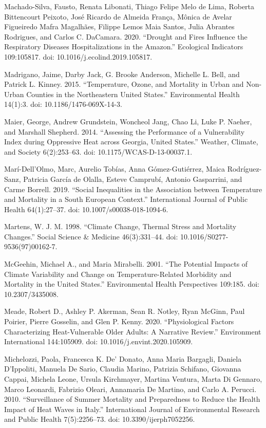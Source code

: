 \documentclass[12pt]{article}
\begin{document}
Machado-Silva, Fausto, Renata Libonati, Thiago Felipe Melo de Lima,
Roberta Bittencourt Peixoto, José Ricardo de Almeida França, Mônica de
Avelar Figueiredo Mafra Magalhães, Filippe Lemos Maia Santos, Julia
Abrantes Rodrigues, and Carlos C. DaCamara. 2020. ``Drought and Fires
Influence the Respiratory Diseases Hospitalizations in the Amazon.''
Ecological Indicators 109:105817. doi: 10.1016/j.ecolind.2019.105817.

Madrigano, Jaime, Darby Jack, G. Brooke Anderson, Michelle L. Bell, and
Patrick L. Kinney. 2015. ``Temperature, Ozone, and Mortality in Urban
and Non-Urban Counties in the Northeastern United States.''
Environmental Health 14(1):3. doi: 10.1186/1476-069X-14-3.

Maier, George, Andrew Grundstein, Woncheol Jang, Chao Li, Luke P.
Naeher, and Marshall Shepherd. 2014. ``Assessing the Performance of a
Vulnerability Index during Oppressive Heat across Georgia, United
States.'' Weather, Climate, and Society 6(2):253--63. doi:
10.1175/WCAS-D-13-00037.1.

Marí-Dell'Olmo, Marc, Aurelio Tobías, Anna Gómez-Gutiérrez, Maica
Rodríguez-Sanz, Patricia García de Olalla, Esteve Camprubí, Antonio
Gasparrini, and Carme Borrell. 2019. ``Social Inequalities in the
Association between Temperature and Mortality in a South European
Context.'' International Journal of Public Health 64(1):27--37. doi:
10.1007/s00038-018-1094-6.

Martens, W. J. M. 1998. ``Climate Change, Thermal Stress and Mortality
Changes.'' Social Science \& Medicine 46(3):331--44. doi:
10.1016/S0277-9536(97)00162-7.

McGeehin, Michael A., and Maria Mirabelli. 2001. ``The Potential Impacts
of Climate Variability and Change on Temperature-Related Morbidity and
Mortality in the United States.'' Environmental Health Perspectives
109:185. doi: 10.2307/3435008.

Meade, Robert D., Ashley P. Akerman, Sean R. Notley, Ryan McGinn, Paul
Poirier, Pierre Gosselin, and Glen P. Kenny. 2020. ``Physiological
Factors Characterizing Heat-Vulnerable Older Adults: A Narrative
Review.'' Environment International 144:105909. doi:
10.1016/j.envint.2020.105909.

Michelozzi, Paola, Francesca K. De' Donato, Anna Maria Bargagli, Daniela
D'Ippoliti, Manuela De Sario, Claudia Marino, Patrizia Schifano,
Giovanna Cappai, Michela Leone, Ursula Kirchmayer, Martina Ventura,
Marta Di Gennaro, Marco Leonardi, Fabrizio Oleari, Annamaria De Martino,
and Carlo A. Perucci. 2010. ``Surveillance of Summer Mortality and
Preparedness to Reduce the Health Impact of Heat Waves in Italy.''
International Journal of Environmental Research and Public Health
7(5):2256--73. doi: 10.3390/ijerph7052256.
\end{document}
